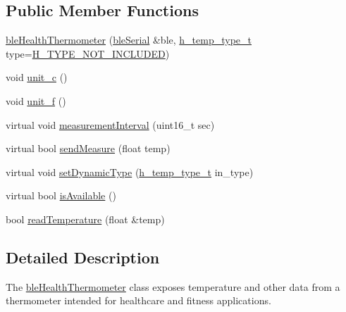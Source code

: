 \subsection*{Public Member Functions}
\begin{DoxyCompactItemize}
\item 
\hyperlink{classble_health_thermometer_a92480888b6ed2b0fe354cc4a5404a63d}{ble\-Health\-Thermometer} (\hyperlink{classble_serial}{ble\-Serial} \&ble, \hyperlink{classble_health_thermometer_ac18502532d0b3bfeeeb10f7929695a3f}{h\-\_\-temp\-\_\-type\-\_\-t} type=\hyperlink{classble_health_thermometer_ac18502532d0b3bfeeeb10f7929695a3fae7439c25f80adab1352472d283c75ea8}{H\-\_\-\-T\-Y\-P\-E\-\_\-\-N\-O\-T\-\_\-\-I\-N\-C\-L\-U\-D\-E\-D})
\item 
void \hyperlink{classble_health_thermometer_a0f00efd291e5b91fef286071d3441172}{unit\-\_\-c} ()
\item 
void \hyperlink{classble_health_thermometer_aafe2468db4033c905394da1d58c83620}{unit\-\_\-f} ()
\item 
virtual void \hyperlink{classble_health_thermometer_acd9cde127f632f06615382b3d03299fd}{measurement\-Interval} (uint16\-\_\-t sec)
\item 
virtual bool \hyperlink{classble_health_thermometer_a09413d493022f3c52dfd269cf01bacd1}{send\-Measure} (float temp)
\item 
virtual void \hyperlink{classble_health_thermometer_a32d3cdc9efb78bed4a5ed728cdb93846}{set\-Dynamic\-Type} (\hyperlink{classble_health_thermometer_ac18502532d0b3bfeeeb10f7929695a3f}{h\-\_\-temp\-\_\-type\-\_\-t} in\-\_\-type)
\item 
virtual bool \hyperlink{classble_health_thermometer_a39b5e5ae997a87c7393e363cb540c421}{is\-Available} ()
\item 
bool \hyperlink{classble_health_thermometer_a8d54f2c7e49f12ca5846e55dcab0ab3b}{read\-Temperature} (float \&temp)
\end{DoxyCompactItemize}


\subsection{Detailed Description}
The \hyperlink{classble_health_thermometer}{ble\-Health\-Thermometer} class exposes temperature and other data from a thermometer intended for healthcare and fitness applications. 

